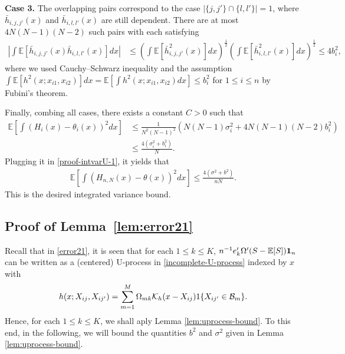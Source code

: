 \documentclass[preprint,11pt]{article}
\newcommand{\mbb}{\mathbb}
\newcommand{\mcal}{\mathcal}
\numberwithin{equation}{section}
\begin{document}
    \textbf{Case 3.} The overlapping pairs correspond to the case $|\{j,j'\}\cap\{l,l'\}|=1$, where $\bar{h}_{i,j,j'}(x)$ and $\bar{h}_{i,l,l'}(x)$ are still dependent. There are at most $4N(N-1)(N-2)$ such pairs with each satisfying
    \begin{align*}
        \left|\int \mbb{E}[\bar{h}_{i,j,j'}(x)\bar{h}_{i,l,l'}(x)]dx\right|&\le \left(\int \mbb{E}[\bar{h}^2_{i,j,j'}(x)]dx\right)^{\frac{1}{2}}\left(\int \mbb{E}[\bar{h}^2_{i,l,l'}(x)]dx\right)^{\frac{1}{2}}\le 4b_i^2,
    \end{align*}
    where we used Cauchy–Schwarz inequality and the assumption $\int \mbb{E}[h^2(x;x_{i1},x_{i2})]dx=\mbb{E}[\int h^2(x;x_{i1},x_{i2})dx]\le b_i^2$ for $1\le i\le n$ by Fubini's theorem.

    Finally, combing all cases, there exists a constant $C>0$ such that
    \begin{align*}
        \mbb{E}\left[\int (H_i(x)-\theta_i(x))^2dx\right]&\le \frac{1}{N^2(N-1)^2}\left(N(N-1)\sigma_i^2+4N(N-1)(N-2)b_i^2\right)\\
        &\le \frac{4(\sigma_i^2+b_i^2)}{N}.
    \end{align*}
    Plugging it in \eqref{proof-intvarU-1}, it yields that
    \begin{align*}
        \mbb{E}\left[\int (H_{n,N}(x)-\theta(x))^2dx\right]\le \frac{4(\sigma^2+b^2)}{nN}.
    \end{align*}
    This is the desired integrated variance bound.





\subsection{Proof of Lemma~\ref{lem:error21}}
Recall that in \eqref{error21}, it is seen that for each $1\le k\le K$, $n^{-1}e_k'\Omega'(S -\mathbb{E}[S]){\bf 1}_n$ can be written as a (centered) U-process in \eqref{incomplete-U-process} indexed by $x$ with
\begin{align*}
    h(x;X_{ij},X_{ij'})=\sum_{m=1}^M \Omega_{mk} {\cal K}_h(x-X_{ij})1\{X_{ij'}\in\mcal{B}_m\}.
\end{align*}
Hence, for each $1\le k\le K$, we shall aply Lemma \ref{lem:uprocess-bound}. To this end, in the following, we will bound the quantities $b^2$ and $\sigma^2$ given in Lemma \ref{lem:uprocess-bound}.
\end{document}
